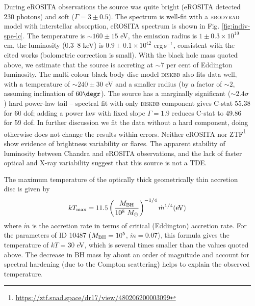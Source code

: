 \documentclass[fleqn,usenatbib]{mnras}
\newcommand{\ergps}{erg\,s$^{-1}$}
\begin{document}
During eROSITA observations the source was quite bright (eROSITA detected 230 photons) and soft ($\Gamma=3\pm0.5$). The spectrum is well-fit with a \textsc{bbodyrad} model with interstellar absorption, eROSITA spectrum is shown in Fig. \ref{fig:indiv-spe-lc}. The temperature is $\sim160\pm15$ eV, the emission radius is $1\pm0.3\times10^{10}$ cm, the luminosity (0.3--8 keV) is $0.9\pm0.1\times10^{42}$ \ergps, consistent with the cited works (bolometric correction is small). With the  black hole mass quoted above, we estimate that the source is accreting at $\sim7$ per cent of Eddington luminosity. The multi-colour black body disc model \textsc{diskbb} also fits data well, with a temperature of $\sim240\pm30$ eV and a smaller radius (by a factor of $\sim2$, assuming inclination of $60\degr$). The source has a marginally significant ($\sim2.4\sigma$) hard power-law tail  -- spectral fit with only \textsc{diskbb} component gives C-stat 55.38 for 60 dof; adding a power law with fixed slope $\Gamma=1.9$ reduces  C-stat to 49.86 for 59 dof. In further discussion we fit the data without a hard component,  doing otherwise does not change the results within errors.  Neither eROSITA nor ZTF\footnote{\url{https://ztf.snad.space/dr17/view/480206200003099}} show evidence of brightness variability or flares.  The apparent stability of luminosity between Chandra and eROSITA observations, and the lack of faster optical and X-ray variability suggest that this source is not a TDE.  



The maximum temperature of the optically thick geometrically thin  accretion disc  is given by  \citep{Shakura1973} 
$$kT_{\rm max} = 11.5 \left(\frac{M_{\rm BH}}{10^8~M_\odot} \right)^{-1/4} {\dot{m}}^{1/4} \text{\rm (eV)}$$
where $\dot{m}$ is the accretion rate in terms of critical (Eddington)  accretion rate.  For the parameters of ID 10487 ($M_{\rm BH}=10^5$, $\dot{m}=0.07$), this formula gives the temperature of $kT=30$ eV, which is several times smaller than the values quoted above. The decrease in BH mass by about an order of magnitude and account for spectral hardening (due to the Compton scattering)  helps to explain the observed temperature.
\end{document}
